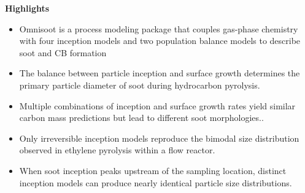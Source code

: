\begin{titlepage}
	
	\pagestyle{empty} %
	\nolinenumbers
	
	\textbf{\large{Highlights}}
	\vspace{0.3cm}
	
	\begin{itemize}
		\item Omnisoot is a process modeling package that couples gas-phase chemistry with four inception models and two population balance models to describe soot and CB formation
		
		\item The balance between particle inception and surface growth determines the primary particle diameter of soot during hydrocarbon pyrolysis.
		
		\item Multiple combinations of inception and surface growth rates yield similar carbon mass predictions but lead to different soot morphologies..
		
		\item Only irreversible inception models reproduce the bimodal size distribution observed in ethylene pyrolysis within a flow reactor.
		
		\item When soot inception peaks upstream of the sampling location, distinct inception models can produce nearly identical particle size distributions.
	\end{itemize}
	
	
\end{titlepage}